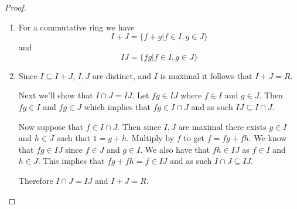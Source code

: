 \documentclass[10pt]{article}
\theoremstyle{plain}
\theoremstyle{remark}
\begin{document}
\begin{proof}
  \begin{enumerate}
  \item For a commutative ring we have
    \[ I+J = \{f+g|f\in I,g\in J\}\]
    and
    \[ IJ = \{fg|f\in I, g\in J \}\]
  \item Since $I\subseteq I+J$, $I,J$ are distinct, and $I$ is maximal it follows that $I+J=R$.

    Next we'll show that $I\cap J=IJ$. Let $fg\in IJ$ where $f\in I$ and $g\in J$. Then $fg\in I$ and $fg\in J$ which implies that
    $fg\in I\cap J$ and as such $IJ\subseteq I\cap J$.

    Now suppose that $f\in I\cap J$. Then since $I,J$ are maximal there exists $g\in I$ and $h\in J$ such that
    $1=g+h$. Multiply by $f$ to get $f=fg+fh$. We know that $fg\in IJ$ since $f\in J$ and $g\in I$. We also have
    that $fh \in IJ$ as $f\in I$ and $h\in J$. This implies that $fg+fh=f\in IJ$ and as such $I\cap J \subseteq IJ$.

    Therefore $I\cap J = IJ$ and $I+J = R$.
  \end{enumerate}
\end{proof}

\end{document}
